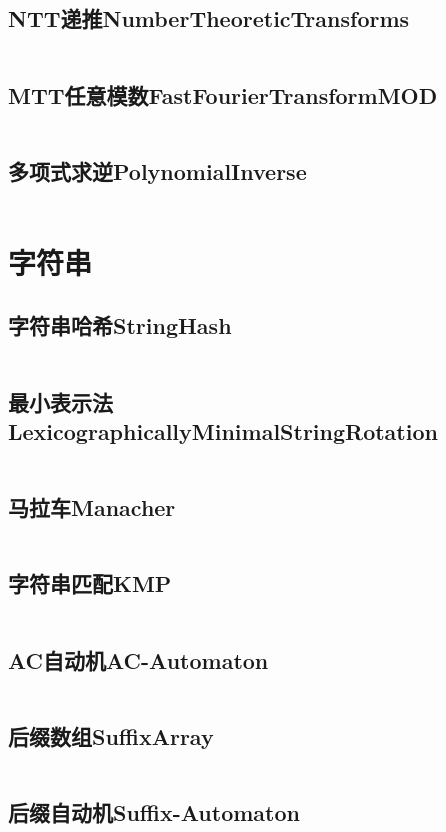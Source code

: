 \documentclass[10pt,a4paper]{ctexart}
\renewcommand{\_}{\textscale{1}{\textunderscore}}
\renewcommand{\_}{\textscale{1}{\textunderscore}}
\begin{document}
\subsection{NTT递推Number\_Theoretic\_Transforms}
\inputminted{c++}{../多项式/NTT递推Number_Theoretic_Transforms.cpp}
\subsection{MTT任意模数Fast\_Fourier\_Transform\_MOD}
\inputminted{c++}{../多项式/MTT任意模数Fast_Fourier_Transform_MOD.cpp}
\subsection{多项式求逆Polynomial\_Inverse}
\inputminted{c++}{../多项式/多项式求逆Polynomial_Inverse.cpp}

\newpage
\section{字符串}
\subsection{字符串哈希String\_Hash}
\inputminted{c++}{../字符串/字符串哈希String_Hash.cpp}
\subsection{最小表示法Lexicographically\_Minimal\_String\_Rotation}
\inputminted{c++}{../字符串/最小表示法Lexicographically_Minimal_String_Rotation.cpp}
\subsection{马拉车Manacher}
\inputminted{c++}{../字符串/马拉车Manacher.cpp}
\subsection{字符串匹配KMP}
\inputminted{c++}{../字符串/字符串匹配KMP.cpp}
\subsection{AC自动机AC-Automaton}
\inputminted{c++}{../字符串/AC自动机AC-Automaton.cpp}
\subsection{后缀数组Suffix\_Array}
\inputminted{c++}{../字符串/后缀数组Suffix_Array.cpp}
\subsection{后缀自动机Suffix-Automaton}
\inputminted{c++}{../字符串/后缀自动机Suffix-Automaton.cpp}
\end{document}
